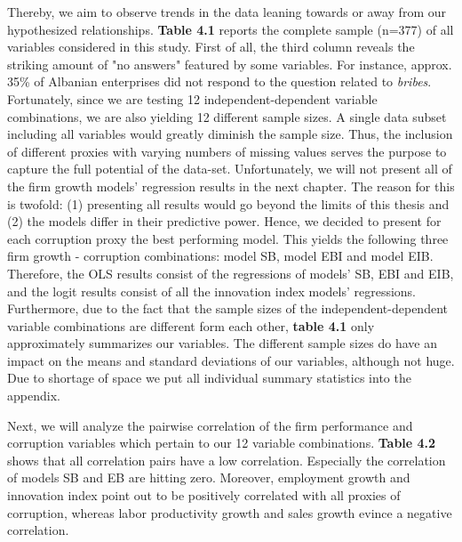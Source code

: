 Thereby, we aim to observe trends in the data leaning towards or away from our hypothesized relationships. \textbf{Table 4.1} reports the complete sample (n=377) of all variables considered in this study. First of all, the third column reveals the striking amount of "no answers" featured by some variables. For instance, approx. 35\% of Albanian enterprises did not respond to the question related to \textit{bribes}. Fortunately, since we are testing 12 independent-dependent variable combinations, we are also yielding 12 different sample sizes. A single data subset including all variables would greatly diminish the sample size. Thus, the inclusion of different proxies with varying numbers of missing values serves the purpose to capture the full potential of the data-set. Unfortunately, we will not present all of the firm growth models' regression results in the next chapter. The reason for this is twofold: (1) presenting all results would go beyond the limits of this thesis and (2) the models differ in their predictive power. Hence, we decided to present for each corruption proxy the best performing model. This yields the following three firm growth - corruption combinations: model SB, model EBI and model EIB. Therefore, the OLS results consist of the regressions of models' SB, EBI and EIB, and the logit results consist of all the innovation index models' regressions. Furthermore, due to the fact that the sample sizes of the independent-dependent variable combinations are different form each other, \textbf{table 4.1} only approximately summarizes our variables. The different sample sizes do have an impact on the means and standard deviations of our variables, although not huge. Due to shortage of space we put all individual summary statistics into the appendix.

Next, we will analyze the pairwise correlation of the firm performance and corruption variables which pertain to our 12 variable combinations. \textbf{Table 4.2} shows that  all correlation pairs have a low correlation. Especially the correlation of models SB and EB are hitting zero. Moreover, employment growth and innovation index point out to be positively correlated with all proxies of corruption, whereas labor productivity growth and sales growth evince a negative correlation.


